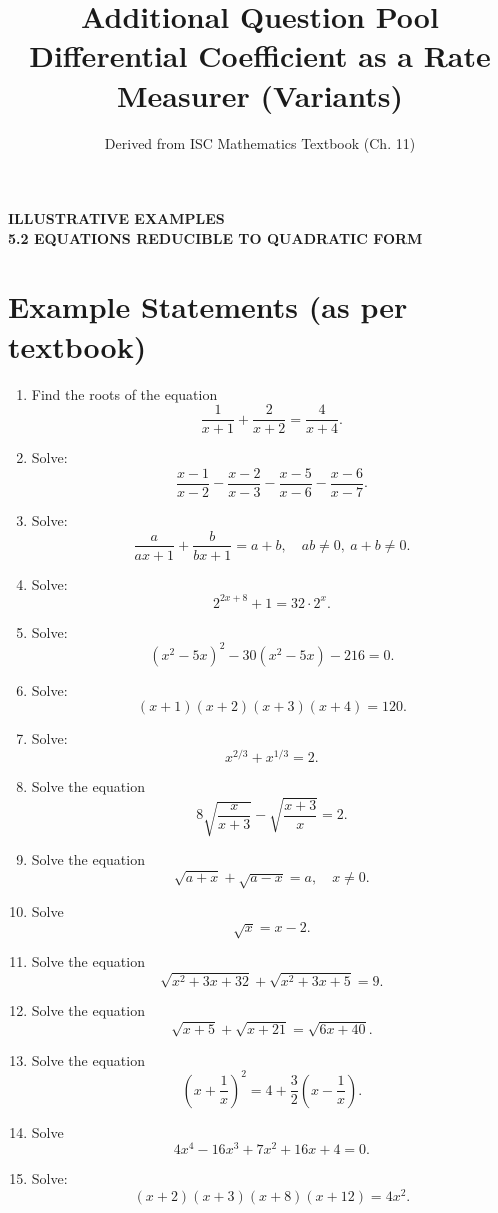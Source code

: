 \documentclass[12pt,a4paper]{article}
\title{\textbf{Additional Question Pool}\\[0.5em]
	\large Differential Coefficient as a Rate Measurer (Variants)}
\author{Derived from ISC Mathematics Textbook (Ch. 11)}
\date{}
\begin{document}
	\begin{center}
	\Large\textbf{ILLUSTRATIVE EXAMPLES}\\[0.3cm]
	\normalsize\textbf{5.2 EQUATIONS REDUCIBLE TO QUADRATIC FORM}
\end{center}

\vspace{0.3cm}

\section*{Example Statements (as per textbook)}

\begin{enumerate}[label=\textbf{Example \arabic*.}, leftmargin=2.5em]
	\item Find the roots of the equation 
	\[\frac{1}{x+1} + \frac{2}{x+2} = \frac{4}{x+4}.\]
	
	\item Solve: 
	\[\frac{x-1}{x-2} - \frac{x-2}{x-3} - \frac{x-5}{x-6} - \frac{x-6}{x-7}.\]
	
	\item Solve: 
	\[\frac{a}{ax+1} + \frac{b}{bx+1} = a + b,\quad ab \neq 0,\ a + b \neq 0.\]
	
	\item Solve: 
	\[2^{2x+8} + 1 = 32 \cdot 2^x.\]
	
	\item Solve: 
	\[(x^2 - 5x)^2 - 30(x^2 - 5x) - 216 = 0.\]
	
	\item Solve: 
	\[(x + 1)(x + 2)(x + 3)(x + 4) = 120.\]
	
	\item Solve: 
	\[x^{2/3} + x^{1/3} = 2.\]
	
	\item Solve the equation 
	\[8 \sqrt{\frac{x}{x+3}} - \sqrt{\frac{x+3}{x}} = 2.\]
	
	\item Solve the equation 
	\[\sqrt{a+x} + \sqrt{a-x} = a,\quad x \neq 0.\]
	
	\item Solve 
	\[\sqrt{x} = x - 2.\]
	
	\item Solve the equation 
	\[\sqrt{x^2 + 3x + 32} + \sqrt{x^2 + 3x + 5} = 9.\]
	
	\item Solve the equation 
	\[\sqrt{x+5} + \sqrt{x+21} = \sqrt{6x+40}.\]
	
	\item Solve the equation 
	\[\left(x + \frac{1}{x}\right)^2 = 4 + \frac{3}{2}\left(x - \frac{1}{x}\right).\]
	
	\item Solve 
	\[4x^4 - 16x^3 + 7x^2 + 16x + 4 = 0.\]
	
	\item Solve: 
	\[(x + 2)(x + 3)(x + 8)(x + 12) = 4x^2.\]
\end{enumerate}
\end{document}
